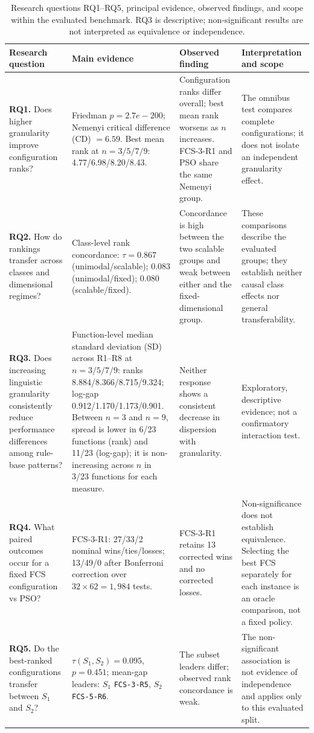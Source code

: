 \begin{table}[H]
\centering
\small
\caption{Research questions RQ1--RQ5, principal evidence, observed findings, and scope within the evaluated benchmark. RQ3 is descriptive; non-significant results are not interpreted as equivalence or independence.}
\label{tab:hypothesis_summary}
\setlength{\tabcolsep}{3pt}
\begin{tabularx}{\textwidth}{@{}>{\raggedright\arraybackslash}p{2.7cm}>{\raggedright\arraybackslash}p{3.7cm}>{\raggedright\arraybackslash}p{3.0cm}>{\raggedright\arraybackslash}X@{}}
\toprule
\textbf{Research question} & \textbf{Main evidence} & \textbf{Observed finding} & \textbf{Interpretation and scope} \\
\midrule
\textbf{RQ1.} Does higher granularity improve configuration ranks? & Friedman $p=2.7e-200$; Nemenyi critical difference (CD) $=6.59$. Best mean rank at $n=3/5/7/9$: 4.77/6.98/8.20/8.43. & Configuration ranks differ overall; best mean rank worsens as $n$ increases. FCS-3-R1 and PSO share the same Nemenyi group. & The omnibus test compares complete configurations; it does not isolate an independent granularity effect. \\
\textbf{RQ2.} How do rankings transfer across classes and dimensional regimes? & Class-level rank concordance: $\tau=0.867$ (unimodal/scalable); 0.083 (unimodal/fixed); 0.080 (scalable/fixed). & Concordance is high between the two scalable groups and weak between either and the fixed-dimensional group. & These comparisons describe the evaluated groups; they establish neither causal class effects nor general transferability. \\
\textbf{RQ3.} Does increasing linguistic granularity consistently reduce performance differences among rule-base patterns? & Function-level median standard deviation (SD) across R1--R8 at $n=3/5/7/9$: ranks 8.884/8.366/8.715/9.324; log-gap 0.912/1.170/1.173/0.901. Between $n=3$ and $n=9$, spread is lower in 6/23 functions (rank) and 11/23 (log-gap); it is non-increasing across $n$ in 3/23 functions for each measure. & Neither response shows a consistent decrease in dispersion with granularity. & Exploratory, descriptive evidence; not a confirmatory interaction test. \\
\textbf{RQ4.} What paired outcomes occur for a fixed FCS configuration vs PSO? & FCS-3-R1: 27/33/2 nominal wins/ties/losses; 13/49/0 after Bonferroni correction over $32\times62=1,984$ tests. & FCS-3-R1 retains 13 corrected wins and no corrected losses. & Non-significance does not establish equivalence. Selecting the best FCS separately for each instance is an oracle comparison, not a fixed policy. \\
\textbf{RQ5.} Do the best-ranked configurations transfer between $S_1$ and $S_2$? & $\tau(S_1,S_2)=0.095$, $p=0.451$; mean-gap leaders: $S_1$ \texttt{FCS-3-R5}, $S_2$ \texttt{FCS-5-R6}. & The subset leaders differ; observed rank concordance is weak. & The non-significant association is not evidence of independence and applies only to this evaluated split. \\
\bottomrule
\end{tabularx}
\end{table}
